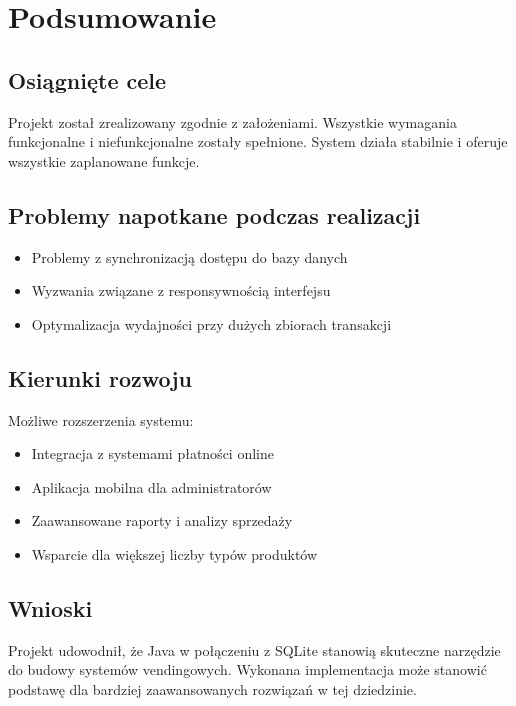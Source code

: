 \section{Podsumowanie}
\subsection{Osiągnięte cele}
Projekt został zrealizowany zgodnie z założeniami. Wszystkie wymagania funkcjonalne i niefunkcjonalne zostały spełnione. System działa stabilnie i oferuje wszystkie zaplanowane funkcje.


\subsection{Problemy napotkane podczas realizacji}
\begin{itemize}
\item Problemy z synchronizacją dostępu do bazy danych
\item Wyzwania związane z responsywnością interfejsu
\item Optymalizacja wydajności przy dużych zbiorach transakcji
\end{itemize}

\subsection{Kierunki rozwoju}
Możliwe rozszerzenia systemu:
\begin{itemize}
\item Integracja z systemami płatności online
\item Aplikacja mobilna dla administratorów
\item Zaawansowane raporty i analizy sprzedaży
\item Wsparcie dla większej liczby typów produktów
\end{itemize}



\subsection{Wnioski}
Projekt udowodnił, że Java w połączeniu z SQLite stanowią skuteczne narzędzie do budowy systemów vendingowych. Wykonana implementacja może stanowić podstawę dla bardziej zaawansowanych rozwiązań w tej dziedzinie.
